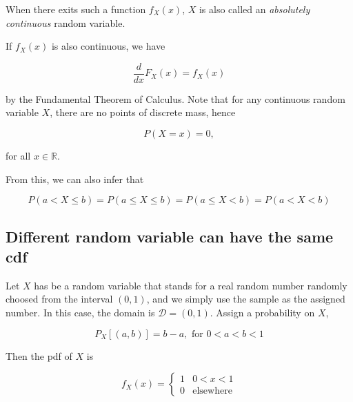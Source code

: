 \documentclass{article}
\begin{document}
            When there exits such a function $ f_{X}(x) $, $ X $ is also called an
            \textit{absolutely continuous} random variable.

            If $ f_{X}(x) $ is also continuous, we have

            \begin{equation*}
                 \frac{d}{dx} F_{X}(x) = f_{X}(x)
            \end{equation*}

            by the Fundamental Theorem of Calculus. Note that for any continuous
            random variable $ X $, there are no points of discrete mass, hence

            \begin{equation*}
                 P(X = x) = 0,
            \end{equation*}

            for all $ x \in \mathbb{R} $.

            From this, we can also infer that

            \begin{equation*}
                 P ( a < X \leq b ) = P ( a \leq X \leq b) = P ( a \leq X < b)
                     = P ( a < X < b)
            \end{equation*}

        \subsection{Different random variable can have the same cdf}

            Let $ X $ has be a random variable that stands for a real
            random number randomly choosed from the interval $ (0, 1) $,
            and we simply use the sample as the assigned number. In this case,
            the domain is $ \mathcal{D} = (0, 1) $. Assign a probability on $ X $,

            \begin{equation*}
                P_{X}[(a, b)] = b - a, \text{ for } 0 < a < b < 1
            \end{equation*}

            Then the pdf of $ X $ is

            \begin{equation*}
                 f_{X}(x) =  \left\{
                     \begin{array}{ll}
                         1 & 0 < x < 1 \\
                         0 & \text{elsewhere}
                     \end{array}
                 \right.
            \end{equation*}
\end{document}
